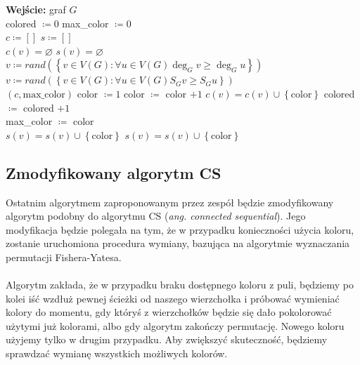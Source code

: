 \documentclass[10pt,a4paper]{article}
\begin{document}
	\begin{algorithmic}
		\State \textbf{Wejście:} graf $G$
		\\
		\State colored $\coloneqq 0$
		\State max\_color $\coloneqq 0$ 
		\\
			\State $c \coloneqq \left[\right]$
			\State $s \coloneqq \left[\right]$
			\\
				\State $c(v) = \varnothing$
				\State $s(v) = \varnothing$
			\EndFor
			\\
			\State $v \coloneqq rand(\left\{v \in V(G): \forall u \in V(G) \deg_{G} v \geq \deg_{G} u \right\})$
			\State {}
			\\
				\State $v \coloneqq rand(\left\{v \in V(G): \forall u \in V(G) S_{G} v \geq S_{G} u \right\})$
				\State {}
			\EndWhile
			\\
			\State \Return $(c, \text{max\_color})$
		\EndFunction
		\pagebreak
			\State color $\coloneqq 1$
				\State color $\coloneqq$ color $+ 1$
			\EndWhile
			\State $c(v) = c(v) \cup \left\{\text{color}\right\}$
			\State colored $\coloneqq$ colored $ + 1$
			\\
				\State max\_color $\coloneqq$ color
			\EndIf
			\\
			\State $s(v) = s(v) \cup \left\{\text{color}\right\}$
				\State $s(v) = s(v) \cup \left\{\text{color}\right\}$
			\EndFor
		\EndProcedure
	\end{algorithmic}

	\subsection{Zmodyfikowany algorytm CS}
	
	Ostatnim algorytmem zaproponowanym przez zespół będzie zmodyfikowany algorytm podobny do algorytmu CS (\textit{ang. connected sequential}). Jego modyfikacja będzie polegała na tym, że w przypadku konieczności użycia koloru, zostanie uruchomiona procedura wymiany, bazująca na algorytmie wyznaczania permutacji Fishera-Yatesa.
	\\~\\
	Algorytm zakłada, że w przypadku braku dostępnego koloru z puli, będziemy po kolei iść wzdłuż pewnej ścieżki od naszego wierzchołka i próbować wymieniać kolory do momentu, gdy któryś z wierzchołków będzie się dało pokolorować użytymi już kolorami, albo gdy algorytm zakończy permutację. Nowego koloru użyjemy tylko w drugim przypadku. Aby zwiększyć skuteczność, będziemy sprawdzać wymianę wszystkich możliwych kolorów.
	
\end{document}
